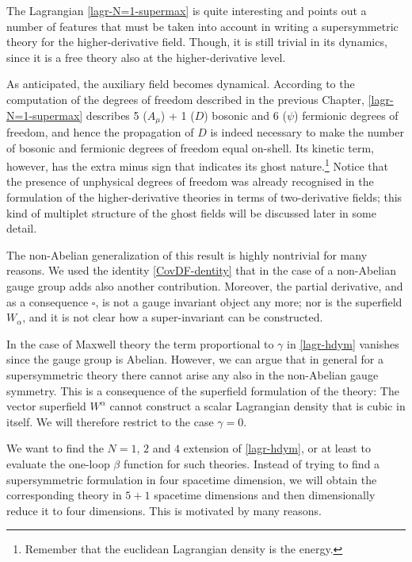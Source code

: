 The Lagrangian \eqref{lagr-N=1-supermax} is quite interesting and points out a number of features that must be taken into account in writing a supersymmetric theory for the higher-derivative \ym{} field. Though, it is still trivial in its dynamics, since it is a free theory also at the higher-derivative level. 

As anticipated, the auxiliary field becomes dynamical. According to the computation of the degrees of freedom described in the previous Chapter, \eqref{lagr-N=1-supermax} describes 5 ($A_{\mu}$) + 1 ($D$) bosonic and 6 ($\psi$) fermionic degrees of freedom, and hence the propagation of $D$ is indeed necessary to make the number of bosonic and fermionic degrees of freedom equal on-shell. Its kinetic term, however, has the extra minus sign that indicates its ghost nature.\footnote{Remember that the euclidean Lagrangian density is the energy.}
Notice that the presence of unphysical degrees of freedom was already recognised in the formulation of the higher-derivative theories in terms of two-derivative fields; this kind of multiplet structure of the ghost fields will be discussed later in some detail.

The non-Abelian generalization of this result is highly nontrivial for many reasons. We used the identity \eqref{CovDF-dentity} that in the case of a non-Abelian gauge group adds also another contribution. Moreover, the partial derivative, and as a consequence $\square$, is not a gauge invariant object any more; nor is the \ym{} superfield $W_\alpha$, and it is not clear how a super-invariant can be constructed.


In the case of Maxwell theory the term proportional to $\gamma$ in \eqref{lagr-hdym} vanishes since the gauge group is Abelian. However, we can argue that in general for a supersymmetric theory there cannot arise any also in the non-Abelian gauge symmetry. This is a consequence of the superfield formulation of the theory: The vector superfield $W^\alpha$ cannot construct a scalar Lagrangian density that is cubic in itself. We will therefore restrict to the case $\gamma = 0$.


We want to find the $N=1$, $2$ and $4$ extension of \eqref{lagr-hdym}, or at least to evaluate the one-loop $\beta$ function for such theories.
Instead of trying to find a supersymmetric formulation in four spacetime dimension, we will obtain the corresponding theory in $5+1$ spacetime dimensions and then dimensionally reduce it to four dimensions. This is motivated by many reasons.



